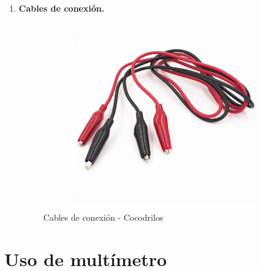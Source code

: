 \documentclass[a4paper,12pt]{report}
\begin{document}
\begin{enumerate}
\begin{figure}[H]
\end{figure}
\item \textbf{Cables de conexión.}
\begin{figure}[H]
\begin{center}
\includegraphics[height = 8cm, width =10.5cm]{cablesdeconexion.jpeg}
\caption{Cables de conexión - Cocodrilos}
\end{center}
\end{figure}
\end{enumerate}
\chapter{Uso de multímetro}
\end{document}
